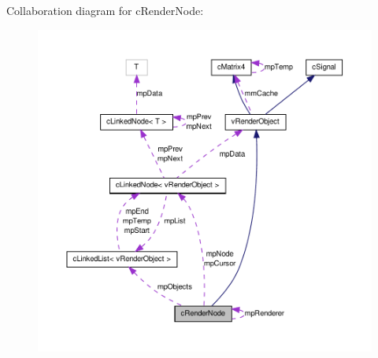 Collaboration diagram for cRenderNode:
\nopagebreak
\begin{figure}[H]
\begin{center}
\leavevmode
\includegraphics[width=400pt]{classc_render_node__coll__graph}
\end{center}
\end{figure}
